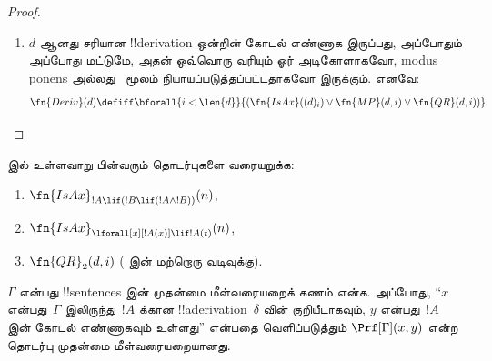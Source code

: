 \documentclass[../../../include/open-logic-section]{subfiles}
\begin{document}
\begin{proof}
\begin{enumerate}
\begin{multline*}
    \concat \Gn{)} \land {}\\
    (d)_j = \Gn{(} \concat b \concat
    \Gn{\lif} \concat \fn{Subst}(a,c,x) \concat \Gn{)} \land {}\\ \fn{Sent}(b)
    \land \fn{Sent}(\fn{Subst}(a,c,x)) \land {} \bforall{k <
      \len{b}}{(b)_k \neq (c)_0})
  \end{multline*}
  இங்கு $c$, $x$ ஆகியவை முறையே மாறிலிக் குறியையும் மாறியையும்
  சொற்களாகக் கருதியவற்றின் கோடல் எண்கள் (அதாவது, அவற்றின் குறிக்
  குறியீடுகள் அல்ல) என்று எடுகொள்கிறோம். $\Subst{!A(x)}{c}{x}$ ஒரு
  !!a{sentence} ஆக உள்ளதா என்று சோதிப்பதன் மூலம் $x$ மட்டுமே
  $!A(x)$ இன் கட்டிலா மாறியா என்று சோதிக்கிறோம்; $!B$ இன் ஒவ்வொரு குறியும்
  $c$ இலிருந்து வேறுபட்டதாக இருக்க வேண்டும் என்று கோருவதன் மூலம்
  $c$ ஆனது~$!B$ இல் இடம்பெறவில்லை என்பதை உறுதிசெய்கிறோம்.

  \QR{} இன் மற்றொரு வடிவைப் பயிற்சியாக விட்டுவைக்கிறோம்.
\item $d$ ஆனது சரியான !!{derivation} ஒன்றின் கோடல் எண்ணாக இருப்பது,
  அப்போதும் அப்போது மட்டுமே, அதன் ஒவ்வொரு வரியும் ஓர் அடிகோளாகவோ,
  modus ponens அல்லது~\QR{} மூலம் நியாயப்படுத்தப்பட்டதாகவோ இருக்கும்.
  எனவே:
  \[
  \fn{Deriv}(d) \defiff \bforall{i < \len{d}}{(\fn{IsAx}((d)_i) \lor
    \fn{MP}(d,i) \lor \fn{QR}(d, i))}
  \]
\end{enumerate}
\end{proof}

\begin{prob}
 இல் உள்ளவாறு பின்வரும்
தொடர்புகளை வரையறுக்க:
\begin{enumerate}
\item $\fn{IsAx}_{!A \lif (!B \lif (!A \land !B))}(n)$,
\item $\fn{IsAx}_{\lforall[x][!A(x)] \lif !A(t)}(n)$,
\item $\fn{QR}_{2}(d, i)$ (\QR{} இன் மற்றொரு வடிவுக்கு).
\end{enumerate}
\end{prob}

\begin{prop}
$\Gamma$ என்பது !!{sentence}s இன் முதன்மை மீள்வரையறைக் கணம் என்க.
அப்போது, “$x$ என்பது~$\Gamma$ இலிருந்து~$!A$ க்கான
!!a{derivation}~$\delta$ வின் குறியீடாகவும், $y$ என்பது~$!A$ இன்
கோடல் எண்ணாகவும் உள்ளது” என்பதை வெளிப்படுத்தும் $\Prf[\Gamma](x, y)$
என்ற தொடர்பு முதன்மை மீள்வரையறையானது.
\end{prop}
\end{document}
